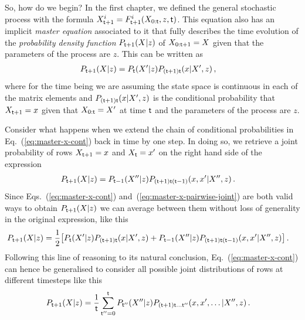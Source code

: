 So, how do we begin? In the first chapter, we defined the general stochastic process with the formula $X^{i}_{{\sf t}+1} = F^{i}_{{\sf t}+1}(X_{0:{\sf t}},z,{\sf t})$. This equation also has an implicit \emph{master equation} associated to it that fully describes the time evolution of the \emph{probability density function} $P_{{\sf t}+1}(X\vert z)$ of $X_{0:{\sf t}+1}=X$ given that the parameters of the process are $z$. This can be written as
\begin{align}
P_{{\sf t}+1}(X\vert z) &= P_{{\sf t}}(X'\vert z) P_{({\sf t}+1){\sf t}}(x\vert X',z) \label{eq:master-x-cont}\,,
\end{align}
where for the time being we are assuming the state space is continuous in each of the matrix elements and $P_{({\sf t}+1){\sf t}}(x\vert X',z)$ is the conditional probability that $X_{{\sf t}+1}=x$ given that $X_{0:{\sf t}}=X'$ at time ${\sf t}$ and the parameters of the process are $z$.

Consider what happens when we extend the chain of conditional probabilities in Eq.~(\ref{eq:master-x-cont}) back in time by one step. In doing so, we retrieve a joint probability of rows $X_{{\sf t}+1}=x$ and $X_{{\sf t}}=x'$ on the right hand side of the expression 
\begin{align}
P_{{\sf t}+1}(X\vert z) &= P_{{\sf t}-1}(X''\vert z) P_{({\sf t}+1){\sf t}({\sf t}-1)}(x,x'\vert X'',z) \label{eq:master-x-pairwise-joint}\,.
\end{align}
Since Eqs.~(\ref{eq:master-x-cont}) and~(\ref{eq:master-x-pairwise-joint}) are both valid ways to obtain $P_{{\sf t}+1}(X\vert z)$ we can average between them without loss of generality in the original expression, like this
\begin{align}
P_{{\sf t}+1}(X\vert z) &= \frac{1}{2}\big[ P_{{\sf t}}(X'\vert z) P_{({\sf t}+1){\sf t}}(x\vert X',z) + P_{{\sf t}-1}(X''\vert z) P_{({\sf t}+1){\sf t}({\sf t}-1)}(x,x'\vert X'',z) \big]\,.
\end{align}
Following this line of reasoning to its natural conclusion, Eq.~(\ref{eq:master-x-cont}) can hence be generalised to consider all possible joint distributions of rows at different timesteps like this
\begin{align}
P_{{\sf t}+1}(X\vert z) &= \frac{1}{{\sf t}}\sum_{{\sf t}''=0}^{{\sf t}}P_{{\sf t}''}(X''\vert z) P_{({\sf t}+1){\sf t}\dots{\sf t}''}(x,x',\dots \vert X'',z) \label{eq:master-x-cont-sum-gen}\,.
\end{align}

